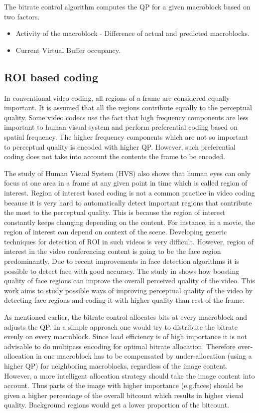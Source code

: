 \documentclass[11pt]{article} %
\begin{document}
The bitrate control algorithm computes the QP for a given macroblock based on two factors. 
\begin{itemize}  
\item Activity of the macroblock - Difference of actual and predicted macroblocks.
\item Current Virtual Buffer occupancy.
\end{itemize}

  \subsection{ROI based coding}
	In conventional video coding, all regions of a frame are considered equally important. It is assumed that all the regions contribute equally to the perceptual quality. Some video codecs use the fact that high frequency components are less important to human visual system and perform preferential coding based on spatial frequency. The higher frequency components which are not so important to perceptual quality is encoded with higher QP. However, such preferential coding does not take into account the contents the frame to be encoded. 

The study of Human Visual System (HVS) also shows that human eyes can only focus at one area in a frame at any given point in time which is called region of interest. Region of interest based coding is not a common practice in video coding because it is very hard to automatically detect important regions that contribute the most to the perceptual quality. This is because the region of interest constantly keeps changing depending on the content. For instance, in a movie, the region of interest can depend on context of the scene. Developing generic techniques for detection of ROI in such videos is very difficult. However, region of interest in the video conferencing content is going to be the face region predominantly. Due to recent improvements in face detection algorithms it is possible to detect face with good accuracy. The study in \cite{HighQualityROICodingForVideoConferencing} shows how boosting quality of face regions can improve the overall perceived quality of the video. This work aims to study possible ways of improving perceptual quality of the video by detecting face regions and coding it with higher quality than rest of the frame.

 As mentioned earlier, the bitrate control allocates bits at every macroblock and adjusts the QP. In a simple approach one would try to distribute the bitrate evenly on every macroblock. Since load efficiency is of high importance it is not advisable to do multipass encoding for optimal bitrate allocation. Therefore over-allocation in one macroblock has to be compensated by under-allocation (using a higher QP) for neighboring macroblocks, regardless of the image content. However, a more intelligent allocation strategy should take the image content into account. Thus parts of the image with higher importance (e.g.faces) should be given a higher percentage of the overall bitcount which results in higher visual quality. Background regions would get a lower proportion of the bitcount.
\end{document}
